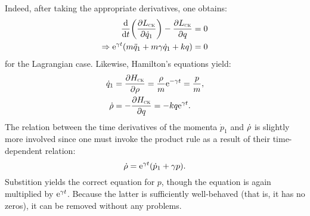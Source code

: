 Indeed, after taking the appropriate derivatives, one obtains:
\begin{equation*} 
    \begin{split}
        \dv{}{t}\qty(\pdv{\ensuremath{L_\text{\tiny{\textsc{CK}}}}}{\dot{q}_1}) - \pdv{\ensuremath{L_\text{\tiny{\textsc{CK}}}}}{q} &= 0 \\
        \Rightarrow \mathrm{e}^{\gamma t}\qty(m\ddot{q}_1 + m\gamma\dot{q}_1 + kq) &= 0
    \end{split}
\end{equation*}
for the Lagrangian case. Likewise, Hamilton's equations yield: \cite{Tokieda2021}
\begin{equation*}
    \begin{split}
        \dot{q}_1 &= \pdv{\ensuremath{H_\text{\tiny{\textsc{CK}}}}}{\ensuremath{\rho}} = \frac{\rho}{m}\mathrm{e}^{-\gamma t} =  \frac{p}{m}, \\
        \dot{\rho} &= -\pdv{\ensuremath{H_\text{\tiny{\textsc{CK}}}}}{q} = -kq\mathrm{e}^{\gamma t}.\\
    \end{split}
\end{equation*}
The relation between the time derivatives of the momenta $\dot{p}_1$ and $\dot{\rho}$ is slightly more involved since one must invoke the product rule as a result of their time-dependent relation:
    $$ \dot{\rho} = \mathrm{e}^{\gamma t}\qty(\dot{p}_1 + \gamma p). $$
Substition yields the correct equation for $p$, though the equation is again multiplied by $\mathrm{e}^{\gamma t}$. Because the latter is sufficiently well-behaved (that is, it has no zeros), it can be removed without any problems.

